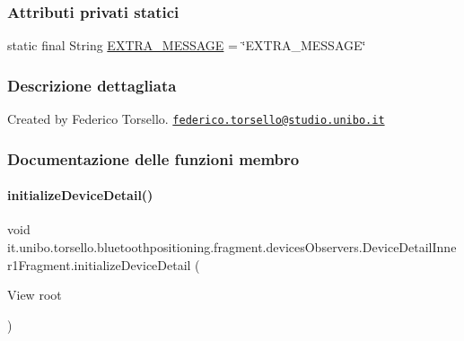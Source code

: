 \subsubsection*{Attributi privati statici}
\begin{DoxyCompactItemize}
\item 
static final String \hyperlink{classit_1_1unibo_1_1torsello_1_1bluetoothpositioning_1_1fragment_1_1devicesObservers_1_1DeviceDetailInner1Fragment_a741715e0af61fb59e24b10e035411cbd_a741715e0af61fb59e24b10e035411cbd}{E\+X\+T\+R\+A\+\_\+\+M\+E\+S\+S\+A\+GE} = \char`\"{}E\+X\+T\+R\+A\+\_\+\+M\+E\+S\+S\+A\+GE\char`\"{}
\end{DoxyCompactItemize}


\subsubsection{Descrizione dettagliata}
Created by Federico Torsello. \href{mailto:federico.torsello@studio.unibo.it}{\tt federico.\+torsello@studio.\+unibo.\+it} 

\subsubsection{Documentazione delle funzioni membro}
\hypertarget{classit_1_1unibo_1_1torsello_1_1bluetoothpositioning_1_1fragment_1_1devicesObservers_1_1DeviceDetailInner1Fragment_a60ac3d2537a790a04e49c72c3651ff25_a60ac3d2537a790a04e49c72c3651ff25}{}\label{classit_1_1unibo_1_1torsello_1_1bluetoothpositioning_1_1fragment_1_1devicesObservers_1_1DeviceDetailInner1Fragment_a60ac3d2537a790a04e49c72c3651ff25_a60ac3d2537a790a04e49c72c3651ff25} 
\paragraph{\texorpdfstring{initialize\+Device\+Detail()}{initializeDeviceDetail()}}
{\footnotesize\ttfamily void it.\+unibo.\+torsello.\+bluetoothpositioning.\+fragment.\+devices\+Observers.\+Device\+Detail\+Inner1\+Fragment.\+initialize\+Device\+Detail (\begin{DoxyParamCaption}\item[{View}]{root }\end{DoxyParamCaption})\hspace{0.3cm}{\ttfamily [private]}}


